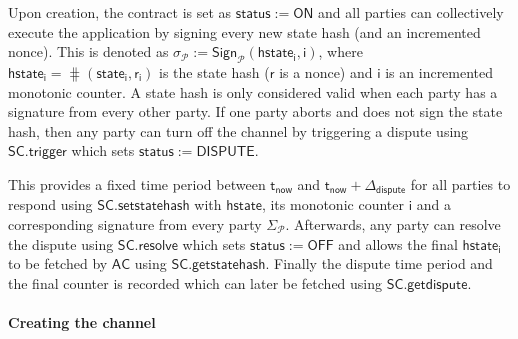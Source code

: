 \documentclass{llncs}
\newcommand{\chanstatus}{\mathsf{status}}
\newcommand{\chanon}{\mathsf{ON}}
\newcommand{\chandispute}{\mathsf{DISPUTE}}
\newcommand{\chanoff}{\mathsf{OFF}}
\newcommand{\cmd}{\mathsf{cmd}}
\newcommand{\hstate}{\mathsf{hstate}}
\newcommand{\hstatei}{\mathsf{hstate}_{\monotoniccounter}}
\newcommand{\hstateplus}{\ensuremath{\mathsf{hstate}_{\monotoniccounter+1}}}
\newcommand{\monotoniccounter}{\mathsf{i}}
\newcommand{\stateinfoi}{\mathsf{state}_{\mathsf{i}}}
\newcommand{\stateinfoplus}{\mathsf{state}_{\mathsf{i+1}}}
\newcommand{\participant}{\mathcal{P}}
\newcommand{\rani}{\mathsf{r}_{\mathsf{i}}}
\newcommand{\ran}{\mathsf{r}}
\newcommand{\statechanneldispute}{\mathsf{SC}.\mathsf{trigger}}
\newcommand{\statechannelsetstate}{\mathsf{SC}.\mathsf{setstatehash}}
\newcommand{\statechannelresolve}{\mathsf{SC}.\mathsf{resolve}}
\newcommand{\statechannelgetcommitment}{\mathsf{SC}.\mathsf{getstatehash}}
\newcommand{\statechannelgetdispute}{\mathsf{SC}.\mathsf{getdispute}}
\newcommand{\sign}{\mathsf{Sign}}
\newcommand{\appcontract}{\mathsf{AC}}
\newcommand{\timenow}{\mathsf{t}_{\mathsf{now}}}
\newcommand{\timedispute}{\timenow + \mathsf{\Delta}_{\mathsf{dispute}}}
\begin{document}
Upon creation, the contract is set as $\chanstatus := \chanon$ and all parties can collectively execute the application by signing every new state hash (and an incremented nonce).
This is denoted as $\sigma_{\participant} := \sign_{\participant}(\hstatei, \monotoniccounter)$, where  $\hstatei = \hash(\stateinfoi, \rani)$ is the state hash ($\ran$ is a nonce) and $\monotoniccounter$ is an incremented monotonic counter. 
A state hash is only considered valid when each party has a signature from every other party. 
If one party aborts and does not sign the state hash, then any party can turn off the channel by triggering a dispute using $\statechanneldispute$ which sets $\chanstatus := \chandispute$. 

This provides a fixed time period between $\timenow$ and $\timedispute$ for all parties to respond using $\statechannelsetstate$ with $\hstate$, its monotonic counter $\monotoniccounter$ and a corresponding signature from every party $\Sigma_{\participant}$. 
Afterwards, any party can resolve the dispute using $\statechannelresolve$ which sets $\chanstatus := \chanoff$ and allows the final $\hstatei$ to be fetched by $\appcontract$ using  $\statechannelgetcommitment$. 
Finally the dispute time period and the final counter is recorded which can later be fetched using $\statechannelgetdispute$. 
%
%

\paragraph{Creating the channel} 
\end{document}

